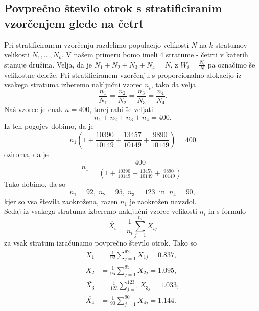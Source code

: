 \documentclass[a4paper,12pt]{article}
\begin{document}
\subsection{Povprečno število otrok s stratificiranim vzorčenjem glede na četrt}
Pri stratificiranem vzorčenju razdelimo populacijo velikosti $N$ na $k$ stratumov velikosti $N_1, \dots, N_k$. V našem primeru bomo imeli 4 
stratume - četrti v katerih stanuje družina.  Velja, da je 
$N_1 + N_2 + N_3 + N_4 = N$, z $W_i = \frac{N_i}{N}$ pa označimo še velikostne deleže. Pri stratificiranem vzorčenju s proporcionalno alokacijo 
iz vsakega stratuma izberemo naključni vzorec $n_i$, tako da velja
\begin{equation*}
    \frac{n_1}{N_1} = \frac{n_2}{N_2} = \frac{n_3}{N_3} = \frac{n_4}{N_4}.
\end{equation*}
Naš vzorec je enak $n=400$, torej rabi še veljati
\begin{equation*}
    n_1 + n_2 + n_3 + n_4 = 400.
\end{equation*}
Iz teh pogojev dobimo, da je 
\begin{equation*}
    n_1\left(1 + \frac{10390}{10149} + \frac{13457}{10149} + \frac{9890}{10149}\right) = 400
\end{equation*}
oziroma, da je
\begin{equation*}
    n_1 = \frac{400}{\left(1 + \frac{10390}{10149} + \frac{13457}{10149} + \frac{9890}{10149}\right)}.
\end{equation*}
Tako dobimo, da so
\begin{equation*}
    n_1 = 92, \; n_2 = 95, \; n_3 = 123 \; \; \text{in} \; \; n_4 = 90,
\end{equation*}
kjer so vsa števila zaokrožena, razen $n_1$ je zaokrožen navzdol.\\
Sedaj iz vsakega stratuma izberemo naključni vzorec velikosti $n_i$ in s formulo
\begin{equation*}
    \overline{X_{i}} = \frac{1}{n_i}\sum_{j=1}^{n_i}X_{ij}
\end{equation*}
za vsak stratum izračunamo povprečno število otrok. Tako so
\begin{align*}
    \overline{X_{1}} &= \frac{1}{92}\sum_{j=1}^{92}X_{1j} = 0.837,\\
    \overline{X_{2}} &= \frac{1}{95}\sum_{j=1}^{95}X_{2j} = 1.095,\\
    \overline{X_{3}} &= \frac{1}{123}\sum_{j=1}^{123}X_{3j} = 1.033,\\
    \overline{X_{4}} &= \frac{1}{90}\sum_{j=1}^{90}X_{4j} = 1.144.
\end{align*}
\end{document}
